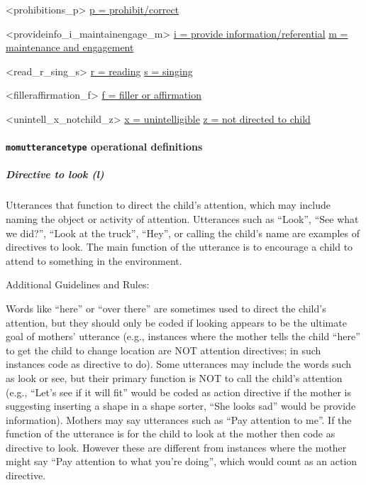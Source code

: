 \documentclass[
  12pt,
]{book}
\begin{document}
\textless prohibitions\_p\textgreater{}
\protect\hyperlink{prohibit_correct}{p = prohibit/correct}

\textless provideinfo\_i\_maintainengage\_m\textgreater{}
\protect\hyperlink{provide_info}{i = provide information/referential}
\protect\hyperlink{maintenance_engagement}{m = maintenance and engagement}

\textless read\_r\_sing\_s\textgreater{}
\protect\hyperlink{reading}{r = reading}
\protect\hyperlink{singing}{s = singing}

\textless filleraffirmation\_f\textgreater{}
\protect\hyperlink{filler_affirmation}{f = filler or affirmation}

\textless unintell\_x\_notchild\_z\textgreater{}
\protect\hyperlink{unintelligible_mom}{x = unintelligible}
\protect\hyperlink{not_directed_to_child}{z = not directed to child}

\hypertarget{momutterancetype-operational-definitions}{%
\paragraph*{\texorpdfstring{\texttt{momutterancetype} operational definitions}{momutterancetype operational definitions}}\label{momutterancetype-operational-definitions}}

\hypertarget{directive_to_look}{%
\subparagraph*{Directive to look (l)}\label{directive_to_look}}

Utterances that function to direct the child's attention, which may include naming the object or activity of attention. Utterances such as ``Look'', ``See what we did?'', ``Look at the truck'', ``Hey'', or calling the child's name are examples of directives to look. The main function of the utterance is to encourage a child to attend to something in the environment.

Additional Guidelines and Rules:

Words like ``here'' or ``over there'' are sometimes used to direct the child's attention, but they should only be coded if looking appears to be the ultimate goal of mothers' utterance (e.g., instances where the mother tells the child ``here'' to get the child to change location are NOT attention directives; in such instances code as directive to do).
Some utterances may include the words such as look or see, but their primary function is NOT to call the child's attention (e.g., ``Let's see if it will fit'' would be coded as action directive if the mother is suggesting inserting a shape in a shape sorter, ``She looks sad'' would be provide information). Mothers may say utterances such as ``Pay attention to me''. If the function of the utterance is for the child to look at the mother then code as directive to look. However these are different from instances where the mother might say ``Pay attention to what you're doing'', which would count as an action directive.
\end{document}
